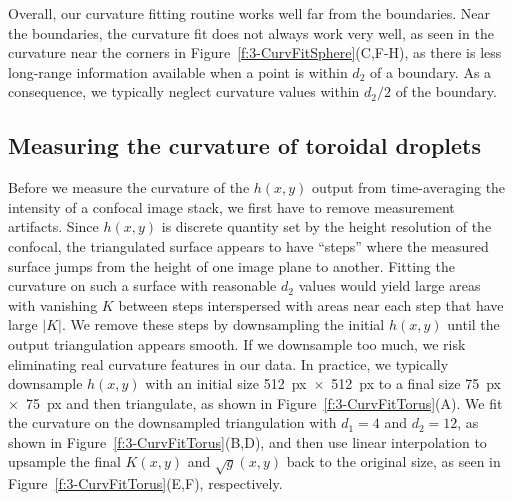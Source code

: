 Overall, our curvature fitting routine works well far from the boundaries.
Near the boundaries, the curvature fit does not always work very well, as seen in the curvature near the corners in Figure~\ref{f:3-CurvFitSphere}(C,F-H), as there is less long-range information available when a point is within $d_2$ of a boundary.
As a consequence, we typically neglect curvature values within $d_2/2$ of the boundary.


\subsection{Measuring the curvature of toroidal droplets}
Before we measure the curvature of the $h(x,y)$ output from time-averaging the intensity of a confocal image stack, we first have to remove measurement artifacts.
Since $h(x,y)$ is discrete quantity set by the height resolution of the confocal, the triangulated surface appears to have ``steps'' where the measured surface jumps from the height of one image plane to another.
Fitting the curvature on such a surface with reasonable $d_2$ values would yield large areas with vanishing $K$ between steps interspersed with areas near each step that have large $|K|$.
We remove these steps by downsampling the initial $h(x,y)$ until the output triangulation appears smooth.
If we downsample too much, we risk eliminating real curvature features in our data.
In practice, we typically downsample $h(x,y)$ with an initial size 512~px~$\times$~512~px to a final size 75~px~$\times$~75~px and then triangulate, as shown in Figure~\ref{f:3-CurvFitTorus}(A).
We fit the curvature on the downsampled triangulation with $d_1 = 4$ and $d_2 = 12$, as shown in Figure~\ref{f:3-CurvFitTorus}(B,D), and then use linear interpolation to upsample the final $K(x,y)$ and $\sqrt{g}(x,y)$ back to the original size, as seen in Figure~\ref{f:3-CurvFitTorus}(E,F), respectively.
